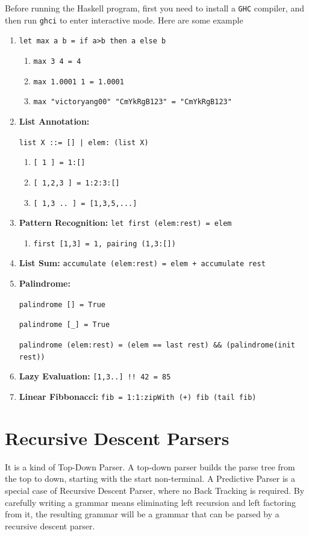 \documentclass[a4paper]{exam}
\begin{document}
Before running the Haskell program, first you need to install a \texttt{GHC} compiler, and then run \texttt{ghci} to enter interactive mode. Here are some example
\begin{enumerate}
    \item \texttt{let max a b = if a>b then a else b}
    \begin{enumerate}
        \item \texttt{max 3 4 = 4}
        \item \texttt{max 1.0001 1 = 1.0001}
        \item \texttt{max "victoryang00" "CmYkRgB123" = "CmYkRgB123"}
    \end{enumerate}
    \item \textbf{List Annotation:}
    
    \texttt{list X ::= [] | elem: (list  X)}
    \begin{enumerate}
        \item \texttt{[ 1 ] = 1:[]}
        \item \texttt{[ 1,2,3 ] = 1:2:3:[]}
        \item \texttt{[ 1,3 .. ] = [1,3,5,...]}
    \end{enumerate}
    \item \textbf{Pattern Recognition:} \texttt{let first (elem:rest) = elem}
    \begin{enumerate}
        \item \texttt{first [1,3] = 1, pairing (1,3:[])}
    \end{enumerate}
    \item \textbf{List Sum:} \texttt{accumulate (elem:rest) = elem + accumulate rest}
    \item \textbf{Palindrome:} 
    
    \texttt{palindrome []  = True}
    
     \texttt{palindrome [\_] = True}
     
     \texttt{palindrome (elem:rest) = (elem == last rest) \&\& (palindrome(init rest))}
     \item \textbf{Lazy Evaluation:} \texttt{[1,3..] !! 42 = 85}
     \item \textbf{Linear Fibbonacci:} \texttt{fib = 1:1:zipWith (+) fib (tail fib)}
\end{enumerate}

\section{Recursive Descent Parsers}
It is a kind of Top-Down Parser. A top-down parser builds the parse tree from the top to down, starting with the start non-terminal. A Predictive Parser is a special case of Recursive Descent Parser, where no Back Tracking is required.
By carefully writing a grammar means eliminating left recursion and left factoring from it, the resulting grammar will be a grammar that can be parsed by a recursive descent parser.
\end{document}
